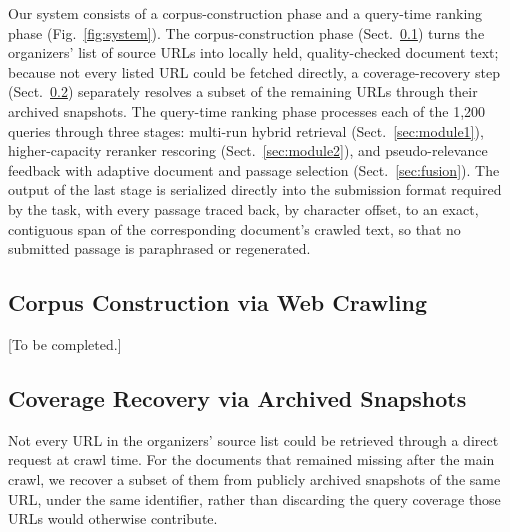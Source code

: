 \documentclass[runningheads]{llncs}
\begin{document}
Our system consists of a corpus-construction phase and a query-time ranking
phase (Fig.~\ref{fig:system}). The corpus-construction phase
(Sect.~\ref{sec:crawl}) turns the organizers' list of source URLs into
locally held, quality-checked document text; because not every listed URL
could be fetched directly, a coverage-recovery step
(Sect.~\ref{sec:coverage}) separately resolves a subset of the remaining URLs
through their archived snapshots. The query-time ranking phase processes each
of the 1{,}200 queries through three stages: multi-run hybrid retrieval
(Sect.~\ref{sec:module1}), higher-capacity reranker rescoring
(Sect.~\ref{sec:module2}), and pseudo-relevance feedback with adaptive
document and passage selection (Sect.~\ref{sec:fusion}). The output of the
last stage is serialized directly into the submission format required by the
task, with every passage traced back, by character offset, to an exact,
contiguous span of the corresponding document's crawled text, so that no
submitted passage is paraphrased or regenerated.

\subsection{Corpus Construction via Web Crawling}
\label{sec:crawl}

[To be completed.]

\subsection{Coverage Recovery via Archived Snapshots}
\label{sec:coverage}

Not every URL in the organizers' source list could be retrieved through a
direct request at crawl time. For the documents that remained missing after
the main crawl, we recover a subset of them from publicly archived snapshots
of the same URL, under the same identifier, rather than discarding the query
coverage those URLs would otherwise contribute.
\end{document}
